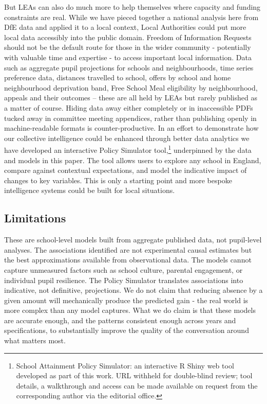 \documentclass[
  12pt,
  titlepage]{article}
\begin{document}
But LEAs can also do much more to help themselves where capacity and
funding constraints are real. While we have pieced together a national
analysis here from DfE data and applied it to a local context, Local
Authorities could put more local data accessibly into the public domain.
Freedom of Information Requests should not be the default route for
those in the wider community - potentially with valuable time and
expertise - to access important local information. Data such as
aggregate pupil projections for schools and neighbourhoods, time series
preference data, distances travelled to school, offers by school and
home neighbourhood deprivation band, Free School Meal eligibility by
neighbourhood, appeals and their outcomes -- these are all held by LEAs
but rarely published as a matter of course. Hiding data away either
completely or in inaccessible PDFs tucked away in committee meeting
appendices, rather than publishing openly in machine-readable formats is
counter-productive. In an effort to demonstrate how our collective
intelligence could be enhanced through better data analytics we have
developed an interactive Policy Simulator tool,\footnote{School
  Attainment Policy Simulator: an interactive R Shiny web tool developed
  as part of this work. URL withheld for double-blind review; tool
  details, a walkthrough and access can be made available on request
  from the corresponding author via the editorial office.} underpinned
by the data and models in this paper. The tool allows users to explore
any school in England, compare against contextual expectations, and
model the indicative impact of changes to key variables. This is only a
starting point and more bespoke intelligence systems could be built for
local situations.

\subsection{Limitations}\label{limitations}

These are school-level models built from aggregate published data, not
pupil-level analyses. The associations identified are not experimental
causal estimates but the best approximations available from
observational data. The models cannot capture unmeasured factors such as
school culture, parental engagement, or individual pupil resilience. The
Policy Simulator translates associations into indicative, not
definitive, projections. We do not claim that reducing absence by a
given amount will mechanically produce the predicted gain - the real
world is more complex than any model captures. What we do claim is that
these models are accurate enough, and the patterns consistent enough
across years and specifications, to substantially improve the quality of
the conversation around what matters most.
\end{document}
